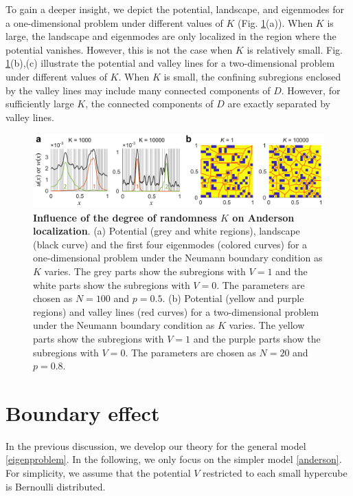 \documentclass[a4paper,11pt]{article}
\begin{document}
To gain a deeper insight, we depict the potential, landscape, and eigenmodes for a one-dimensional problem under different values of $K$ (Fig. \ref{fig2}(a)). When $K$ is large, the landscape and eigenmodes are only localized in the region where the potential vanishes. However, this is not the case when $K$ is relatively small. Fig. \ref{fig2}(b),(c) illustrate the potential and valley lines for a two-dimensional problem under different values of $K$. When $K$ is small, the confining subregions enclosed by the valley lines may include many connected components of $D$. However, for sufficiently large $K$, the connected components of $D$ are exactly separated by valley lines.
\begin{figure}
\centering
\includegraphics[width=\linewidth]{Fig2}
\caption{\textbf{Influence of the degree of randomness $K$ on Anderson localization}. (a) Potential (grey and white regions), landscape (black curve) and the first four eigenmodes (colored curves) for a one-dimensional problem under the Neumann boundary condition as $K$ varies. The grey parts show the subregions with $V=1$ and the white parts show the subregions with $V=0$. The parameters are chosen as $N=100$ and $p=0.5$. (b) Potential (yellow and purple regions) and valley lines (red curves) for a two-dimensional problem under the Neumann boundary condition as $K$ varies. The yellow parts show the subregions with $V = 1$ and the purple parts show the subregions with $V = 0$. The parameters are chosen as $N=20$ and $p=0.8$.}
\label{fig2}
\end{figure}


\section{Boundary effect}\label{boundary}
In the previous discussion, we develop our theory for the general model \eqref{eigenproblem}. In the following, we only focus on the simpler model \eqref{anderson}. For simplicity, we assume that the potential $V$ restricted to each small hypercube is Bernoulli distributed.
\end{document}

